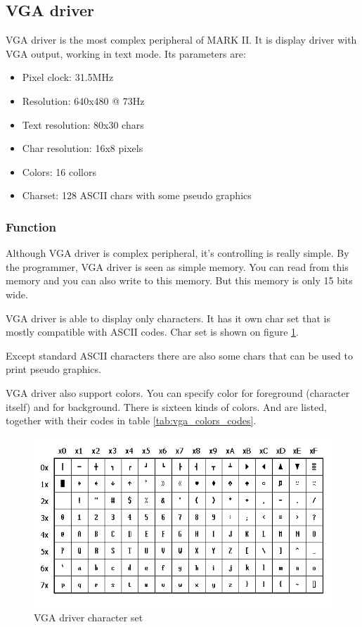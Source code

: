 \subsection{VGA driver}

VGA driver is the most complex peripheral of MARK II. It is display driver with
VGA output, working in text mode. Its parameters are:

\begin{itemize}
    \item Pixel clock: 31.5MHz
    \item Resolution: 640x480 @ 73Hz
    \item Text resolution: 80x30 chars
    \item Char resolution: 16x8 pixels
    \item Colors: 16 collors
    \item Charset: 128 ASCII chars with some pseudo graphics
\end{itemize}

\subsubsection{Function}

Although VGA driver is complex peripheral, it's controlling is really simple.
By the programmer, VGA driver is seen as simple memory. You can read from this
memory and you can also write to this memory. But this memory is only 15 bits
wide.

VGA driver is able to display only characters. It has it own char set that is
mostly compatible with ASCII codes. Char set is shown on figure
\ref{fig:MARK_II_charset}.

Except standard ASCII characters there are also some chars that can be used to
print pseudo graphics.

VGA driver also support colors. You can specify color for foreground (character
itself) and for background. There is sixteen kinds of colors. And are listed,
together with their codes in table \ref{tab:vga_colors_codes}.

\begin{figure}[h]
    \centering
    \includegraphics[width=.85\textwidth]{img/MARKII_charset.png}
    \caption{VGA driver character set}
    \label{fig:MARK_II_charset}
\end{figure}

